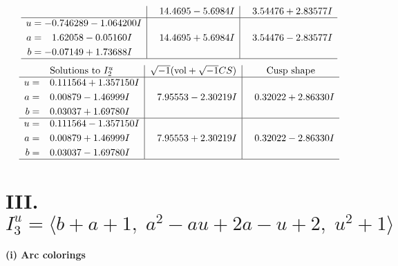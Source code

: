 \documentclass[1p]{elsarticle_modified}
\theoremstyle{definition}
\newcommand{\I}{\sqrt{-1}}
\begin{document}
$$\begin{array}{c|c|c}
 & \phantom{-}14.4695 - 5.6984 I & \phantom{-}3.54476 + 2.83577 I \\ \hline\begin{aligned}
u &= -0.746289 - 1.064200 I \\
a &= \phantom{-}1.62058 - 0.05160 I \\
b &= -0.07149 + 1.73688 I\end{aligned}
 & \phantom{-}14.4695 + 5.6984 I & \phantom{-}3.54476 - 2.83577 I\\
 \hline 
 \end{array}$$\newpage$$\begin{array}{c|c|c}  
\text{Solutions to }I^u_{2}& \I (\text{vol} + \sqrt{-1}CS) & \text{Cusp shape}\\
 \hline 
\begin{aligned}
u &= \phantom{-}0.111564 + 1.357150 I \\
a &= \phantom{-}0.00879 - 1.46999 I \\
b &= \phantom{-}0.03037 + 1.69780 I\end{aligned}
 & \phantom{-}7.95553 - 2.30219 I & \phantom{-}0.32022 + 2.86330 I \\ \hline\begin{aligned}
u &= \phantom{-}0.111564 - 1.357150 I \\
a &= \phantom{-}0.00879 + 1.46999 I \\
b &= \phantom{-}0.03037 - 1.69780 I\end{aligned}
 & \phantom{-}7.95553 + 2.30219 I & \phantom{-}0.32022 - 2.86330 I\\
 \hline 
 \end{array}$$\newpage\newpage\renewcommand{\arraystretch}{1}
\centering \section*{III. $I^u_{3}= \langle b+a+1,\;a^2- a u+2 a- u+2,\;u^2+1 \rangle$}
\flushleft \textbf{(i) Arc colorings}\\
\end{document}
